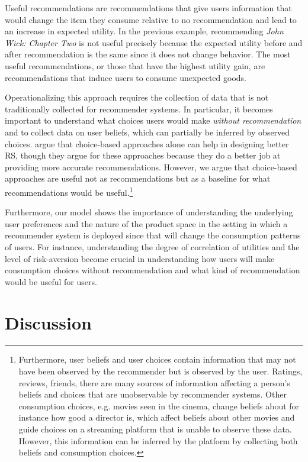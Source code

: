 \documentclass[sigconf]{acmart}
\begin{document}
Useful recommendations are recommendations that give users information that would change the item they consume relative to no recommendation and lead to an increase in expected utility. In the previous example, recommending \textit{John Wick: Chapter Two} is not useful precisely because the expected utility before and after recommendation is the same since it does not change behavior. The most useful recommendations, or those that have the highest utility gain, are recommendations that induce users to consume unexpected goods.

Operationalizing this approach requires the collection of data that is not traditionally collected for recommender systems. In particular, it becomes important to understand what choices users would make \textit{without recommendation} and to collect data on user beliefs, which can partially be inferred by observed choices. \cite{jiang2014choice, saavedra2016choice} argue that choice-based approaches alone can help in designing better RS, though they argue for these approaches because they do a better job at providing more accurate recommendations. However, we argue that choice-based approaches are useful not as recommendations but as a baseline for what recommendations would be useful.\footnote{Furthermore, user beliefs and user choices contain information that may not have been observed by the recommender but is observed by the user. Ratings, reviews, friends, there are many sources of information affecting a person's beliefs and choices that are unobservable by recommender systems. Other consumption choices, e.g. movies seen in the cinema, change beliefs about for instance how good a director is, which affect beliefs about other movies and guide choices on a streaming platform that is unable to observe these data. However, this information can be inferred by the platform by collecting both beliefs and consumption choices.}

Furthermore, our model shows the importance of understanding the underlying user preferences and the nature of the product space in the setting in which a recommender system is deployed since that will change the consumption patterns of users. For instance, understanding the degree of correlation of utilities and the level of risk-aversion become crucial in understanding how users will make consumption choices without recommendation and what kind of recommendation would be useful for users.

\section{Discussion}
\end{document}
